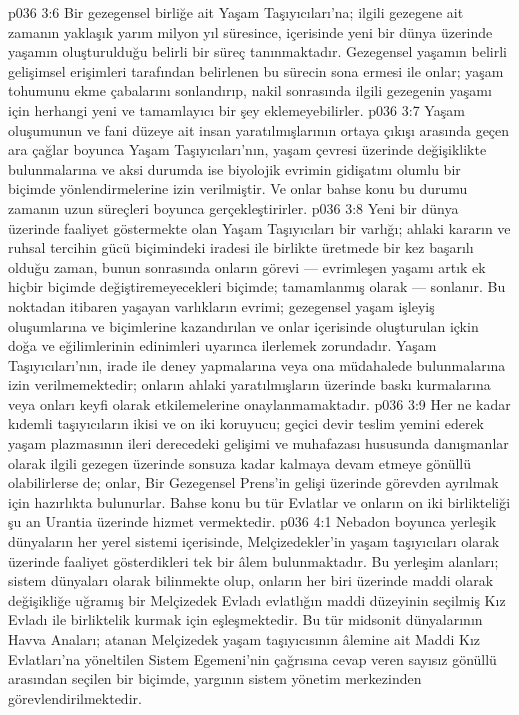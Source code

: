 \vs p036 3:6 Bir gezegensel birliğe ait Yaşam Taşıyıcıları’na; ilgili gezegene ait zamanın yaklaşık yarım milyon yıl süresince, içerisinde yeni bir dünya üzerinde yaşamın oluşturulduğu belirli bir süreç tanınmaktadır. Gezegensel yaşamın belirli gelişimsel erişimleri tarafından belirlenen bu sürecin sona ermesi ile onlar; yaşam tohumunu ekme çabalarını sonlandırıp, nakil sonrasında ilgili gezegenin yaşamı için herhangi yeni ve tamamlayıcı bir şey eklemeyebilirler.
\vs p036 3:7 Yaşam oluşumunun ve fani düzeye ait insan yaratılmışlarının ortaya çıkışı arasında geçen ara çağlar boyunca Yaşam Taşıyıcıları’nın, yaşam çevresi üzerinde değişiklikte bulunmalarına ve aksi durumda ise biyolojik evrimin gidişatını olumlu bir biçimde yönlendirmelerine izin verilmiştir. Ve onlar bahse konu bu durumu zamanın uzun süreçleri boyunca gerçekleştirirler.
\vs p036 3:8 Yeni bir dünya üzerinde faaliyet göstermekte olan Yaşam Taşıyıcıları bir varlığı; ahlaki kararın ve ruhsal tercihin gücü biçimindeki iradesi ile birlikte üretmede bir kez başarılı olduğu zaman, bunun sonrasında onların görevi --- evrimleşen yaşamı artık ek hiçbir biçimde değiştiremeyecekleri biçimde; tamamlanmış olarak --- sonlanır. Bu noktadan itibaren yaşayan varlıkların evrimi; gezegensel yaşam işleyiş oluşumlarına ve biçimlerine kazandırılan ve onlar içerisinde oluşturulan içkin doğa ve eğilimlerinin edinimleri uyarınca ilerlemek zorundadır. Yaşam Taşıyıcıları’nın, irade ile deney yapmalarına veya ona müdahalede bulunmalarına izin verilmemektedir; onların ahlaki yaratılmışların üzerinde baskı kurmalarına veya onları keyfi olarak etkilemelerine onaylanmamaktadır.
\vs p036 3:9 Her ne kadar kıdemli taşıyıcıların ikisi ve on iki koruyucu; geçici devir teslim yemini ederek yaşam plazmasının ileri derecedeki gelişimi ve muhafazası hususunda danışmanlar olarak ilgili gezegen üzerinde sonsuza kadar kalmaya devam etmeye gönüllü olabilirlerse de; onlar, Bir Gezegensel Prens’in gelişi üzerinde görevden ayrılmak için hazırlıkta bulunurlar. Bahse konu bu tür Evlatlar ve onların on iki birlikteliği şu an Urantia üzerinde hizmet vermektedir.
\vs p036 4:1 Nebadon boyunca yerleşik dünyaların her yerel sistemi içerisinde, Melçizedekler’in yaşam taşıyıcıları olarak üzerinde faaliyet gösterdikleri tek bir âlem bulunmaktadır. Bu yerleşim alanları;  sistem dünyaları olarak bilinmekte olup, onların her biri üzerinde maddi olarak değişikliğe uğramış bir Melçizedek Evladı evlatlığın maddi düzeyinin seçilmiş Kız Evladı ile birliktelik kurmak için eşleşmektedir. Bu tür midsonit dünyalarının Havva Anaları; atanan Melçizedek yaşam taşıyıcısının âlemine ait Maddi Kız Evlatları’na yöneltilen Sistem Egemeni’nin çağrısına cevap veren sayısız gönüllü arasından seçilen bir biçimde, yargının sistem yönetim merkezinden görevlendirilmektedir.
